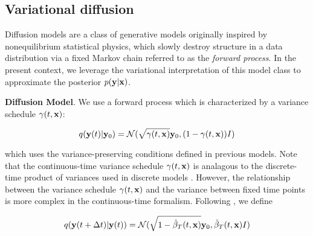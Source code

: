 

\subsection{Variational diffusion}

Diffusion models \parencite{Ho2020,Song2021} are a class of generative models originally inspired by nonequilibrium statistical physics, which slowly destroy structure in a data distribution via a fixed Markov chain referred to as the \emph{forward process}. In the present context, we leverage the variational interpretation of this model class \parencite{Kingma2021,Kingma2023} to approximate the posterior $p(\bold{y}\lvert\bold{x})$. 

\textbf{Diffusion Model}. We use a forward process which is characterized by a variance schedule $\gamma(t,\bold{x})$:

\begin{equation*}
q(\bold{y}(t)\lvert\bold{y}_{0}) = \mathcal{N}(\sqrt{\gamma(t,\bold{x})}\bold{y}_{0},(1-\gamma(t,\bold{x}))I)
\end{equation*}

which uses the variance-preserving conditions defined in previous models. Note that the continuous-time variance schedule $\gamma(t,\bold{x})$ is analagous to the discrete-time product of variances used in discrete models \parencite{Ho2020}. However, the relationship between the variance schedule $\gamma(t,\bold{x})$ and the variance between fixed time points is more complex in the continuous-time formalism. Following \parencite{Maggiora2023}, we define

\begin{equation*}
q(\bold{y}(t+\Delta t)\lvert\bold{y}(t)) = \mathcal{N}(\sqrt{1-\hat{\beta}_{T}(t,\bold{x})}\bold{y}_{0},\hat{\beta}_{T}(t,\bold{x})I)
\end{equation*}

